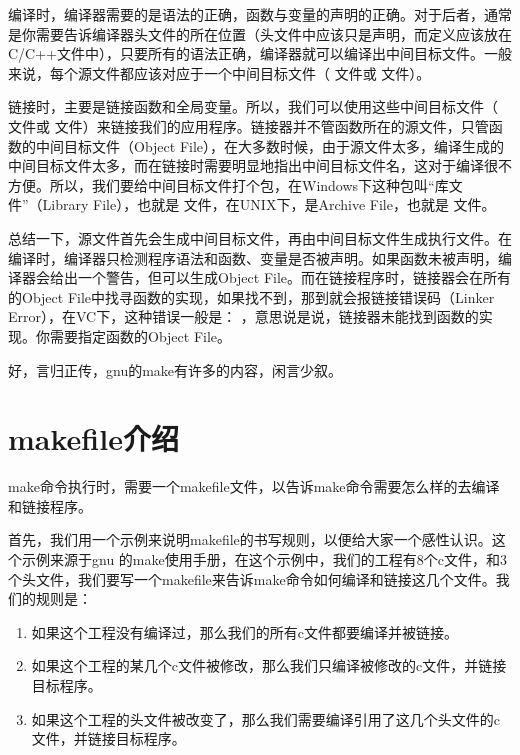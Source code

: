\documentclass[a4paper,10pt]{sphinxmanual}
\begin{document}
编译时，编译器需要的是语法的正确，函数与变量的声明的正确。对于后者，通常是你需要告诉编译器头文件的所在位置（头文件中应该只是声明，而定义应该放在C/C++文件中），只要所有的语法正确，编译器就可以编译出中间目标文件。一般来说，每个源文件都应该对应于一个中间目标文件（  文件或
 文件）。

链接时，主要是链接函数和全局变量。所以，我们可以使用这些中间目标文件（  文件或
 文件）来链接我们的应用程序。链接器并不管函数所在的源文件，只管函数的中间目标文件（Object File），在大多数时候，由于源文件太多，编译生成的中间目标文件太多，而在链接时需要明显地指出中间目标文件名，这对于编译很不方便。所以，我们要给中间目标文件打个包，在Windows下这种包叫“库文件”（Library File），也就是  文件，在UNIX下，是Archive File，也就是
 文件。

总结一下，源文件首先会生成中间目标文件，再由中间目标文件生成执行文件。在编译时，编译器只检测程序语法和函数、变量是否被声明。如果函数未被声明，编译器会给出一个警告，但可以生成Object File。而在链接程序时，链接器会在所有的Object File中找寻函数的实现，如果找不到，那到就会报链接错误码（Linker Error），在VC下，这种错误一般是：  ，意思说是说，链接器未能找到函数的实现。你需要指定函数的Object File。

好，言归正传，gnu的make有许多的内容，闲言少叙。


\chapter{makefile介绍}
\label{\detokenize{introduction:makefile}}\label{\detokenize{introduction::doc}}
make命令执行时，需要一个makefile文件，以告诉make命令需要怎么样的去编译和链接程序。

首先，我们用一个示例来说明makefile的书写规则，以便给大家一个感性认识。这个示例来源于gnu
的make使用手册，在这个示例中，我们的工程有8个c文件，和3个头文件，我们要写一个makefile来告诉make命令如何编译和链接这几个文件。我们的规则是：
\begin{enumerate}
\def\theenumi{\arabic{enumi}}
\def\labelenumi{\theenumi .}
\makeatletter\def\p@enumii{\p@enumi \theenumi .}\makeatother
\item {} 
如果这个工程没有编译过，那么我们的所有c文件都要编译并被链接。

\item {} 
如果这个工程的某几个c文件被修改，那么我们只编译被修改的c文件，并链接目标程序。

\item {} 
如果这个工程的头文件被改变了，那么我们需要编译引用了这几个头文件的c文件，并链接目标程序。

\end{enumerate}
\end{document}
